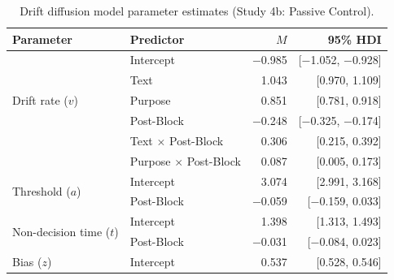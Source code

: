 \documentclass[pdflatex,sn-nature]{sn-jnl}
\begin{document}
\begin{appendices}
\begin{table}[htbp]
\caption{Drift diffusion model parameter estimates (Study 4b: Passive Control).}
\label{tab:S20}
\begin{tabular*}{\textwidth}{@{\extracolsep{\fill}}llrr@{}}
\toprule
Parameter & Predictor & $M$ & 95\% HDI \\
\midrule
\multirow{5}{*}{Drift rate ($v$)} & Intercept & $-$0.985 & [$-$1.052, $-$0.928] \\
 & Text                              & 1.043  & [0.970, 1.109]   \\
 & Purpose                           & 0.851  & [0.781, 0.918]   \\
 & Post-Block                        & $-$0.248 & [$-$0.325, $-$0.174] \\
 & Text $\times$ Post-Block          & 0.306  & [0.215, 0.392]   \\
 & Purpose $\times$ Post-Block       & 0.087  & [0.005, 0.173]   \\
\midrule
\multirow{2}{*}{Threshold ($a$)} & Intercept & 3.074 & [2.991, 3.168] \\
 & Post-Block                        & $-$0.059 & [$-$0.159, 0.033] \\
\midrule
\multirow{2}{*}{Non-decision time ($t$)} & Intercept & 1.398 & [1.313, 1.493] \\
 & Post-Block                        & $-$0.031 & [$-$0.084, 0.023] \\
\midrule
Bias ($z$) & Intercept & 0.537 & [0.528, 0.546] \\
\bottomrule
\end{tabular*}
\end{table}


\end{appendices}
\end{document}
